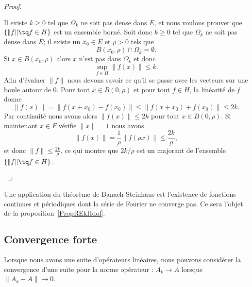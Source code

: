 \begin{proof}
\begin{subproof}
		\spitem[La majoration]
		Il existe \( k\geq 0\) tel que \( \Omega_k\) ne soit pas dense dans \( E\), et nous voulons prouver que \( \{ \| f \|\tq f\in H \}\) est un ensemble borné. Soit donc \( k\geq 0\) tel que \( \Omega_k\) ne soit pas dense dans \( E\); il existe un \( x_0\in E\) et \( \rho>0\) tels que
		\begin{equation}
			B(x_0,\rho)\cap \Omega_k=\emptyset.
		\end{equation}
		Si \( x\in B(x_0,\rho)\) alors \( x\) n'est pas dans \( \Omega_k\) et donc
		\begin{equation}
			\sup_{f\in H}\| f(x) \|\leq k.
		\end{equation}
		Afin d'évaluer \( \| f \|\) nous devons savoir ce qu'il se passe avec les vecteurs sur une boule autour de \( 0\). Pour tout \( x\in B(0,\rho)\) et pour tout \( f\in H\), la linéarité de \( f\) donne
		\begin{equation}
			\| f(x) \|=\| f(x+x_0)-f(x_0) \|\leq \| f(x+x_0)+f(x_0) \|\leq 2k.
		\end{equation}
		Par continuité nous avons alors \( \| f(x) \|\leq 2k\) pour tout \( x\in \overline{ B(0,\rho) }\). Si maintenant \( x\in F\) vérifie \( \| x \|=1\) nous avons
		\begin{equation}
			\| f(x) \|=\frac{1}{ \rho }\| f(\rho x) \|\leq \frac{ 2k }{ \rho },
		\end{equation}
		et donc \( \| f \|\leq \frac{ 2k }{ \rho }\), ce qui montre que \( 2k/\rho\) est un majorant de l'ensemble \( \{ \| f \|\tq f\in H \}\).
	\end{subproof}

\end{proof}
Une application du théorème de Banach-Steinhaus est l'existence de fonctions continues et périodiques dont la série de Fourier ne converge pas. Ce sera l'objet de la proposition~\ref{PropREkHdol}.

\subsection{Convergence forte}

Lorsque nous avons une suite d'opérateurs linéaires, nous pouvons considérer la convergence d'une suite pour la norme opérateur : \( A_k\to A\) lorsque \( \| A_k-A \|\to 0\).

